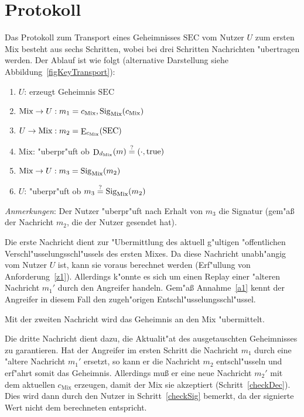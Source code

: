 \documentclass[a4paper,german]{article}
\def\sig{\mathop{\rm Sig}\nolimits}
\def\enc{\mathop{\rm E}\nolimits}
\def\dec{\mathop{\rm D}\nolimits}
\begin{document}
\section{Protokoll}
Das Protokoll zum Transport eines Geheimnisses $\text{SEC}$ vom Nutzer $U$ zum ersten Mix besteht aus sechs Schritten, wobei bei drei Schritten Nachrichten "ubertragen werden. Der Ablauf ist wie folgt (alternative Darstellung siehe Abbildung~\ref{figKeyTransport}):
\begin{enumerate}
\item $U$\hspace{1.233cm}: erzeugt Geheimnis $\text{SEC}$
\item $\text{Mix}\rightarrow U: m_1=c_\text{Mix},\sig_\text{Mix}(c_\text{Mix})$
\item $U\rightarrow\text{Mix}: m_2=\enc_{c_\text{Mix}}(\text{SEC})$
\item \label{checkDec}$\text{Mix}$\hspace{0.925cm}: "uberpr"uft ob $\dec_{d_\text{Mix}}(m)\overset{?}{=}\left(\cdot,\text{true}\right)$
\item $\text{Mix}\rightarrow U: m_3=\sig_\text{Mix}(m_2)$
\item \label{checkSig}$U$\hspace{1.233cm}: "uberpr"uft ob $m_3\overset{?}{=}\sig_\text{Mix}(m_2)$
\end{enumerate}

\noindent
\emph{Anmerkungen}: Der Nutzer "uberpr"uft nach Erhalt von $m_3$ die Signatur  
(gem"a{\ss} der Nachricht $m_2$, die der Nutzer gesendet hat).

Die erste Nachricht dient zur "Ubermittlung des aktuell g"ultigen "offentlichen Verschl"usselungsschl"ussels des ersten Mixes. 
Da diese Nachricht unabh"angig vom Nutzer $U$ ist, kann sie voraus berechnet werden (Erf"ullung von Anforderung~\ref{z1}). 
Allerdings k"onnte es sich um einen Replay einer "alteren Nachricht $m_1'$ durch den Angreifer handeln. Gem"a{\ss} Annahme~\ref{a1} kennt der Angreifer
in diesem Fall den zugeh"origen Entschl"usselungsschl"ussel.

Mit der zweiten Nachricht wird das Geheimnis an den Mix "ubermittelt. 

Die dritte Nachricht dient dazu, die Aktualit"at des ausgetauschten Geheimnisses zu garantieren. 
Hat der Angreifer im ersten Schritt die Nachricht $m_1$ durch eine "altere Nachricht $m_1'$ ersetzt, 
so kann er die Nachricht $m_2$ entschl"usseln und erf"ahrt somit das Geheimnis. Allerdings mu{\ss} er eine neue Nachricht $m_2'$ mit dem 
aktuellen $c_\text{Mix}$ erzeugen, damit der Mix sie akzeptiert (Schritt~\ref{checkDec}). Dies wird dann durch den Nutzer in Schritt~\ref{checkSig} bemerkt, da der signierte Wert nicht dem berechneten entspricht. 
\appendix
\end{document}
